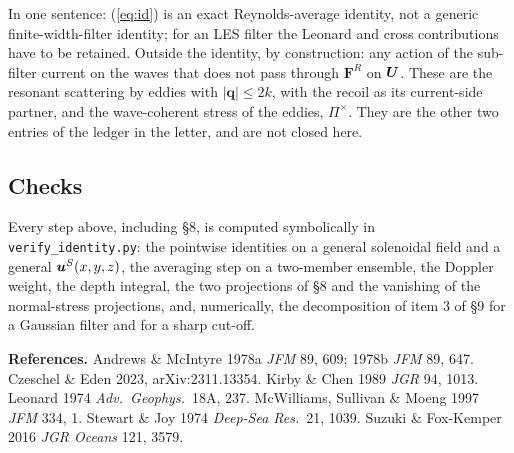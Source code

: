 \documentclass[10pt]{article}
\begin{document}
In one sentence: (\ref{eq:id}) is an exact Reynolds-average identity, not a generic finite-width-filter identity; for an LES filter the Leonard and cross contributions have to be retained. Outside the identity, by construction: any action of the sub-filter current on the waves that does not pass through $\bm F^R$ on $\bm U$. These are the resonant scattering by eddies with $|\bm q|\le2k$, with the recoil as its current-side partner, and the wave-coherent stress of the eddies, $\Pi^\times$. They are the other two entries of the ledger in the letter, and are not closed here.


\subsection*{Checks}
Every step above, including \S8, is computed symbolically in \texttt{verify\_identity.py}: the pointwise identities on a general solenoidal field and a general $\bm u^S(x,y,z)$, the averaging step on a two-member ensemble, the Doppler weight, the depth integral, the two projections of \S8 and the vanishing of the normal-stress projections, and, numerically, the decomposition of item 3 of \S9 for a Gaussian filter and for a sharp cut-off.

{\footnotesize\textbf{References.} Andrews \& McIntyre 1978a \textit{JFM} 89, 609; 1978b \textit{JFM} 89, 647. Czeschel \& Eden 2023, arXiv:2311.13354. Kirby \& Chen 1989 \textit{JGR} 94, 1013. Leonard 1974 \textit{Adv.\ Geophys.}\ 18A, 237. McWilliams, Sullivan \& Moeng 1997 \textit{JFM} 334, 1. Stewart \& Joy 1974 \textit{Deep-Sea Res.}\ 21, 1039. Suzuki \& Fox-Kemper 2016 \textit{JGR Oceans} 121, 3579.\par}
\end{document}
